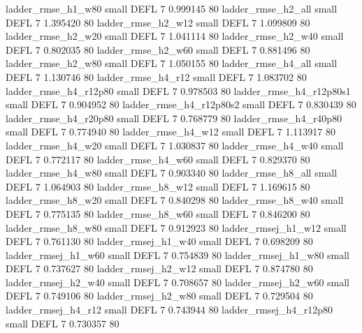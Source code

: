       ladder_rmse_h1_w80      small     DEFL                 7 0.999145 80
      ladder_rmse_h2_all      small     DEFL                 7 1.395420 80
      ladder_rmse_h2_w12      small     DEFL                 7 1.099809 80
      ladder_rmse_h2_w20      small     DEFL                 7 1.041114 80
      ladder_rmse_h2_w40      small     DEFL                 7 0.802035 80
      ladder_rmse_h2_w60      small     DEFL                 7 0.881496 80
      ladder_rmse_h2_w80      small     DEFL                 7 1.050155 80
      ladder_rmse_h4_all      small     DEFL                 7 1.130746 80
      ladder_rmse_h4_r12      small     DEFL                 7 1.083702 80
   ladder_rmse_h4_r12p80      small     DEFL                 7 0.978503 80
 ladder_rmse_h4_r12p80s1      small     DEFL                 7 0.904952 80
 ladder_rmse_h4_r12p80s2      small     DEFL                 7 0.830439 80
   ladder_rmse_h4_r20p80      small     DEFL                 7 0.768779 80
   ladder_rmse_h4_r40p80      small     DEFL                 7 0.774940 80
      ladder_rmse_h4_w12      small     DEFL                 7 1.113917 80
      ladder_rmse_h4_w20      small     DEFL                 7 1.030837 80
      ladder_rmse_h4_w40      small     DEFL                 7 0.772117 80
      ladder_rmse_h4_w60      small     DEFL                 7 0.829370 80
      ladder_rmse_h4_w80      small     DEFL                 7 0.903340 80
      ladder_rmse_h8_all      small     DEFL                 7 1.064903 80
      ladder_rmse_h8_w12      small     DEFL                 7 1.169615 80
      ladder_rmse_h8_w20      small     DEFL                 7 0.840298 80
      ladder_rmse_h8_w40      small     DEFL                 7 0.775135 80
      ladder_rmse_h8_w60      small     DEFL                 7 0.846200 80
      ladder_rmse_h8_w80      small     DEFL                 7 0.912923 80
     ladder_rmsej_h1_w12      small     DEFL                 7 0.761130 80
     ladder_rmsej_h1_w40      small     DEFL                 7 0.698209 80
     ladder_rmsej_h1_w60      small     DEFL                 7 0.754839 80
     ladder_rmsej_h1_w80      small     DEFL                 7 0.737627 80
     ladder_rmsej_h2_w12      small     DEFL                 7 0.874780 80
     ladder_rmsej_h2_w40      small     DEFL                 7 0.708657 80
     ladder_rmsej_h2_w60      small     DEFL                 7 0.749106 80
     ladder_rmsej_h2_w80      small     DEFL                 7 0.729504 80
     ladder_rmsej_h4_r12      small     DEFL                 7 0.743944 80
  ladder_rmsej_h4_r12p80      small     DEFL                 7 0.730357 80
